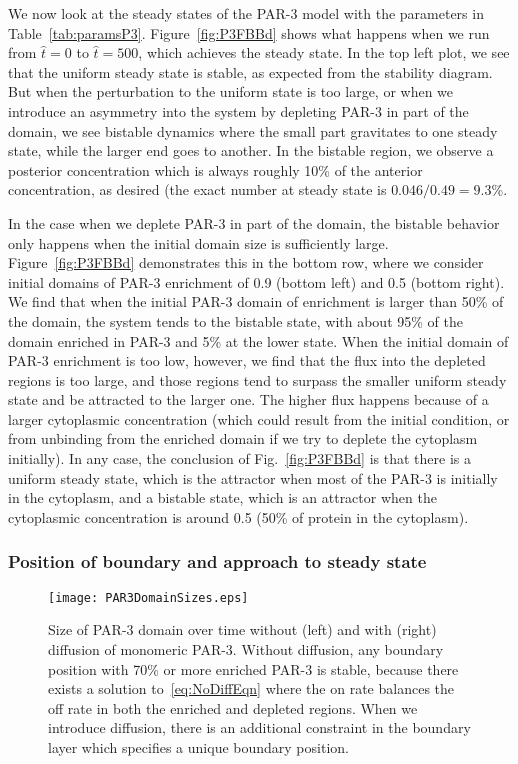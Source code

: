 \documentclass[11pt]{article}
\newcommand{\6}[1]{#1_{\text{6}}}
\newcommand{\3}[1]{#1_{\text{3}}}
\begin{document}
We now look at the steady states of the PAR-3 model with the parameters in Table\ \ref{tab:paramsP3}. Figure\ \ref{fig:P3FBBd} shows what happens when we run from $\hat t = 0$ to $\hat t = 500$, which achieves the steady state. In the top left plot, we see that the uniform steady state is stable, as expected from the stability diagram. But when the perturbation to the uniform state is too large, or when we introduce an asymmetry into the system by depleting PAR-3 in part of the domain, we see bistable dynamics where the small part gravitates to one steady state, while the larger end goes to another. In the bistable region, we observe a posterior concentration which is always roughly 10\% of the anterior concentration, as desired (the exact number at steady state is $0.046/0.49 =9.3$\%. 

In the case when we deplete PAR-3 in part of the domain, the bistable behavior only happens when the initial domain size is sufficiently large. Figure\ \ref{fig:P3FBBd} demonstrates this in the bottom row, where we consider initial domains of PAR-3 enrichment of 0.9 (bottom left) and 0.5 (bottom right). We find that when the initial PAR-3 domain of enrichment is larger than 50\% of the domain, the system tends to the bistable state, with about 95\% of the domain enriched in PAR-3 and 5\% at the lower state. When the initial domain of PAR-3 enrichment is too low, however, we find that the flux into the depleted regions is too large, and those regions tend to surpass the smaller uniform steady state and be attracted to the larger one. The higher flux happens because of a larger cytoplasmic concentration (which could result from the initial condition, or from unbinding from the enriched domain if we try to deplete the cytoplasm initially). In any case, the conclusion of Fig.\ \ref{fig:P3FBBd} is that there is a uniform steady state, which is the attractor when most of the PAR-3 is initially in the cytoplasm, and a bistable state, which is an attractor when the cytoplasmic concentration is around 0.5 (50\% of protein in the cytoplasm). 

\subsubsection{Position of boundary and approach to steady state}

\begin{figure}
\centering
\texttt{[image: PAR3DomainSizes.eps]}
\caption{\label{fig:WWoDiff}Size of PAR-3 domain over time without (left) and with (right) diffusion of monomeric PAR-3. Without diffusion, any boundary position with 70\% or more enriched PAR-3 is stable, because there exists a solution to\ \eqref{eq:NoDiffEqn} where the on rate balances the off rate in both the enriched and depleted regions. When we introduce diffusion, there is an additional constraint in the boundary layer which specifies a unique boundary position.}
\end{figure}
\end{document}
